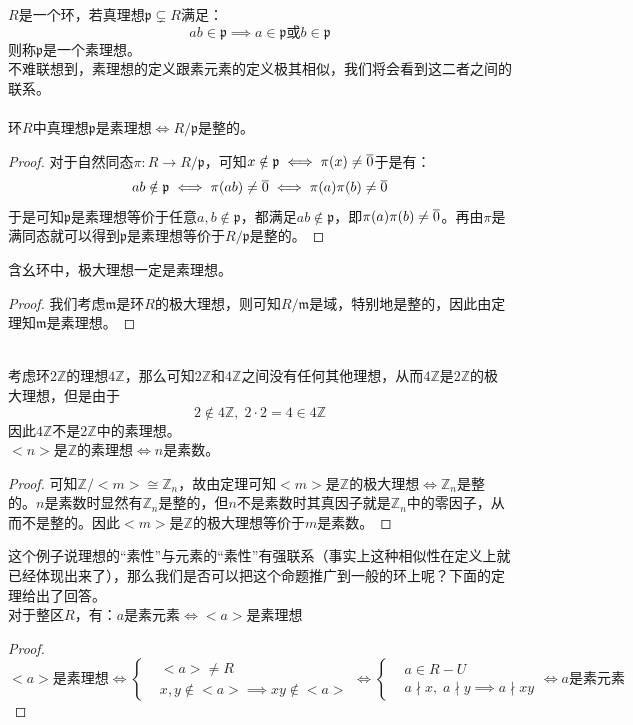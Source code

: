 $R$是一个环，若真理想$\mathfrak{p}\subsetneq R$满足：
\[
ab\in \mathfrak{p}\implies a\in \mathfrak{p}\text{或}b\in \mathfrak{p}
\]
则称$\mathfrak{p}$是一个素理想。\\
\indent 不难联想到，素理想的定义跟素元素的定义极其相似，我们将会看到这二者之间的联系。\\
\\
环$R$中真理想$\mathfrak{p}$是素理想$\iff R/\mathfrak{p}$是整的。
\begin{proof}
对于自然同态$\pi\colon R\to R/\mathfrak{p}$，可知$x\notin \mathfrak{p}\iff \pi(x)\neq \overline{0}$于是有：
\[
ab\notin \mathfrak{p}\iff \pi(ab)\neq \overline{0}\iff \pi(a)\pi(b)\neq \overline{0}
\]
于是可知$\mathfrak{p}$是素理想等价于任意$a,b\notin \mathfrak{p}$，都满足$ab\notin \mathfrak{p}$，即$\pi(a)\pi(b)\neq \overline{0}$。再由$\pi$是满同态就可以得到$\mathfrak{p}$是素理想等价于$R/\mathfrak{p}$是整的。
\end{proof}
含幺环中，极大理想一定是素理想。
\begin{proof}
我们考虑$\mathfrak{m}$是环$R$的极大理想，则可知$R/\mathfrak{m}$是域，特别地是整的，因此由定理知$\mathfrak{m}$是素理想。
\end{proof}
\\
考虑环$2\mathbb{Z}$的理想$4\mathbb{Z}$，那么可知$2\mathbb{Z}$和$4\mathbb{Z}$之间没有任何其他理想，从而$4\mathbb{Z}$是$2\mathbb{Z}$的极大理想，但是由于
\[
2\notin 4\mathbb{Z},\; 2\cdot 2=4\in 4\mathbb{Z}
\]
因此$4\mathbb{Z}$不是$2\mathbb{Z}$中的素理想。\\
$<n>$是$\mathbb{Z}$的素理想$\iff n$是素数。
\begin{proof}
可知$\mathbb{Z}/<m>\cong \mathbb{Z}_n$，故由定理可知$<m>$是$\mathbb{Z}$的极大理想$\iff\mathbb{Z}_n$是整的。$n$是素数时显然有$\mathbb{Z}_n$是整的，但$n$不是素数时其真因子就是$\mathbb{Z}_n$中的零因子，从而不是整的。因此$<m>$是$\mathbb{Z}$的极大理想等价于$m$是素数。
\end{proof}
这个例子说理想的“素性”与元素的“素性”有强联系（事实上这种相似性在定义上就已经体现出来了），那么我们是否可以把这个命题推广到一般的环上呢？下面的定理给出了回答。\\
对于整区$R$，有：$a$是素元素$\iff<a>$是素理想
\begin{proof}
\[
<a>\text{是素理想}\iff \left\{
\begin{aligned}
&<a>\neq R\\
&x,y\notin<a>\implies xy\notin<a>
\end{aligned}\right.
\iff\left\{
\begin{aligned}
&a\in R-U\\
&a\nmid x,\; a\nmid y\implies a\nmid xy
\end{aligned}\right.
\iff a\text{是素元素}
\]
\end{proof}
